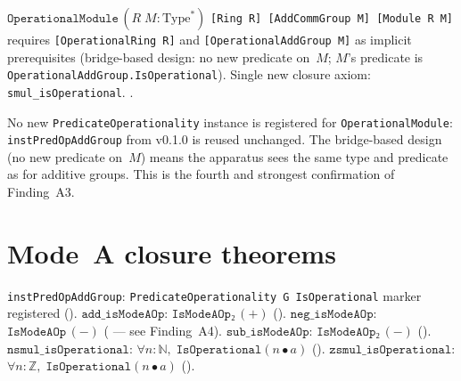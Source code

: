 \begin{definition}
\label{def:OperationalModule}
\leanok
{}
$\texttt{OperationalModule}\,(R\;M : \mathrm{Type}^*)$ \texttt{[Ring R]
[AddCommGroup M] [Module R M]} requires
\texttt{[OperationalRing R]} and \texttt{[OperationalAddGroup M]} as
implicit prerequisites (bridge-based design: no new predicate on~$M$;
$M$'s predicate is \texttt{OperationalAddGroup.IsOperational}).
Single new closure axiom: \texttt{smul\_isOperational}.
\axiomprofile{[]}.

\begin{remark}
\label{rem:module_no_new_instance}
\leanok
{}
No new \texttt{PredicateOperationality} instance is registered for
\texttt{OperationalModule}: \texttt{instPredOpAddGroup} from v0.1.0 is
reused unchanged.  The bridge-based design (no new predicate on~$M$)
means the apparatus sees the same type and predicate as for additive
groups.  This is the fourth and strongest confirmation of Finding~A3.
\end{remark}
\end{definition}

\section{Mode~A closure theorems}
\label{sec:algebra_modeA}

\begin{theorem}
\label{thm:addgroup_modeA}
\leanok
{}
\texttt{instPredOpAddGroup}: \texttt{PredicateOperationality G IsOperational}
marker registered (\axiomprofile{[]}).
$\texttt{add\_isModeAOp}$: $\texttt{IsModeAOp₂}\,(+)$ (\axiomprofile{[]}).
$\texttt{neg\_isModeAOp}$: $\texttt{IsModeAOp}\,(-)$
(\axiomprofile{[propext]} --- see Finding~A4).
$\texttt{sub\_isModeAOp}$: $\texttt{IsModeAOp₂}\,(-)$ (\axiomprofile{[]}).
$\texttt{nsmul\_isOperational}$: $\forall n : \mathbb{N},\;
\texttt{IsOperational}(n \bullet a)$ (\axiomprofile{[]}).
$\texttt{zsmul\_isOperational}$: $\forall n : \mathbb{Z},\;
\texttt{IsOperational}(n \bullet a)$ (\axiomprofile{[]}).
\end{theorem}

